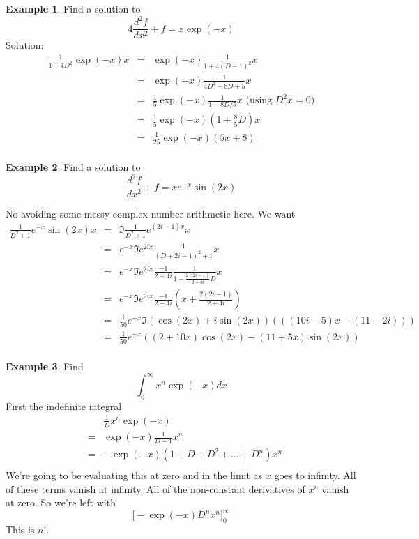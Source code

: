 \documentclass[a4paper]{article}
\theoremstyle{definition}
\newtheorem{example}{Example}[section]
\begin{document}
\begin{example}
Find a solution to
\[
4\frac{d^2f}{dx^2}+f = x\exp(-x)
\]
Solution:
\begin{eqnarray*}
\frac{1}{1+4D^2}\exp(-x)x & = & \exp(-x)\frac{1}{1+4(D-1)^2}x \\
& = & \exp(-x)\frac{1}{4D^2-8D+5}x \\
& = & \frac{1}{5}\exp(-x)\frac{1}{1-8D/5}x \mbox{ (using $D^2x=0$)}\\
& = & \frac{1}{5}\exp(-x)(1+\frac{8}{5}D)x \\
& = & \frac{1}{25}\exp(-x)(5x+8) \\
\end{eqnarray*}
\end{example}

\begin{example}
Find a solution to
\[
\frac{d^2f}{dx^2}+f = x e^{-x}\sin(2x)
\]
\end{example}
No avoiding some messy complex number arithmetic here. We want
\begin{eqnarray*}
\frac{1}{D^2+1}e^{-x}\sin(2x)x & = & \Im\frac{1}{D^2+1}e^{(2i-1)x}x \\
& = & e^{-x}\Im e^{2ix}\frac{1}{(D+2i-1)^2+1}x \\
& = & e^{-x}\Im e^{2ix}\frac{-1}{2+4i}\frac{1}{1-\frac{2(2i-1)}{2+4i}D}x \\
& = & e^{-x}\Im e^{2ix}\frac{-1}{2+4i}(x+\frac{2(2i-1)}{2+4i}) \\
& = & \frac{1}{50}e^{-x}\Im (\cos(2x)+i\sin(2x))(((10i-5)x-(11-2i))) \\
& = & \frac{1}{50}e^{-x}((2+10x)\cos(2x)-(11+5x)\sin(2x)) \\
\end{eqnarray*}

\begin{example}
Find
\[
\int_0^\infty x^n\exp(-x)dx
\]
First the indefinite integral
\begin{eqnarray*}
&   & \frac{1}{D}x^n\exp(-x) \\
& = & \exp(-x)\frac{1}{D-1}x^n \\
& = & -\exp(-x)(1+D+D^2+\ldots+D^n)x^n \\
\end{eqnarray*}
We're going to be evaluating this at zero and in the limit as $x$ goes to infinity.
All of these terms vanish at infinity.
All of the non-constant derivatives of $x^n$ vanish at zero.
So we're left with
\[
\Big[-\exp(-x)D^nx^n\Big]_0^\infty
\]
This is $n!$.
\end{example}
\end{document}
